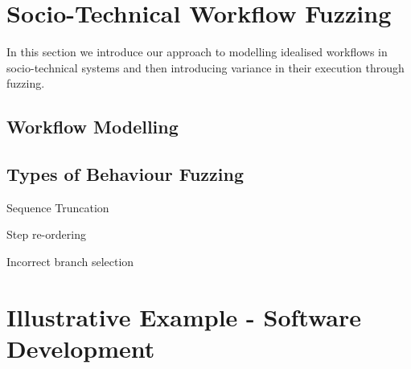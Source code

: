 \documentclass[11pt, twocolumn]{article}
\begin{document}

\section{Socio-Technical Workflow Fuzzing}


In this section we introduce our approach to modelling idealised workflows in
socio-technical systems and then introducing variance in their execution through
fuzzing.


\subsection{Workflow Modelling}




\subsection{Types of Behaviour Fuzzing}


Sequence Truncation

Step re-ordering

Incorrect branch selection


\section{Illustrative Example - Software Development}


\printbibliography

\end{document}
